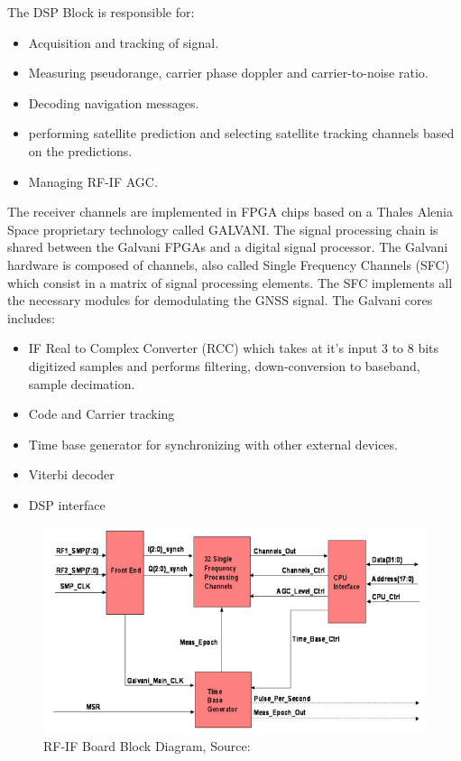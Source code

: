 The DSP Block is responsible for\cite{refstationreceiver}:
\begin{itemize}
    \item Acquisition and tracking of signal.
    \item Measuring pseudorange, carrier phase doppler and carrier-to-noise ratio.
    \item Decoding navigation messages.
    \item performing satellite prediction and selecting satellite tracking channels based on the predictions.
    \item Managing RF-IF AGC.
\end{itemize}

The receiver channels are implemented in FPGA chips based on a Thales Alenia Space proprietary technology called GALVANI\cite{refstationreceiver}. The signal processing chain is shared between the Galvani FPGAs and a digital signal processor. The Galvani hardware is composed of channels, also called Single Frequency Channels (SFC)\cite{refstationreceiver} which consist in a matrix of signal processing elements. The SFC implements all the necessary modules for demodulating the GNSS signal. The Galvani cores includes\cite{refstationreceiver}:

\begin{itemize}
    \item IF Real to Complex Converter (RCC) which takes at it's input 3 to 8 bits digitized samples and performs filtering, down-conversion to baseband, sample decimation.
    \item Code and Carrier tracking
    \item Time base generator for synchronizing with other external devices.
    \item Viterbi decoder
    \item DSP interface
\end{itemize}

\begin{figure}[h]
\centering
\includegraphics[width=\textwidth]{img/galvanicore}
\caption{RF-IF Board Block Diagram, Source:\cite{refstationreceiver}}
\label{fig:galvanicore}
\end{figure}

